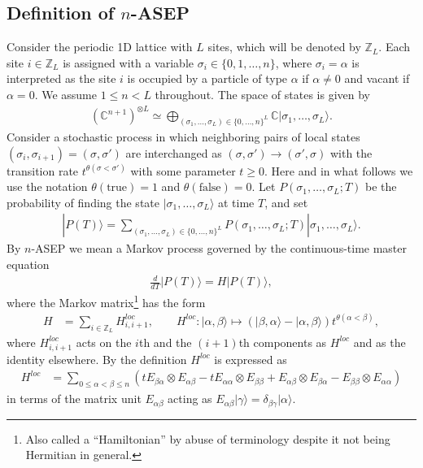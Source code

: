 \documentclass[11pt]{article}
\theoremstyle{definition}
\numberwithin{equation}{section}
\newcommand{\Z}{{\mathbb Z}}
\newcommand{\ket}[1]{\lvert #1 \rangle}
\begin{document}
\subsection{Definition of \texorpdfstring{$n$}{n}-ASEP}
Consider the periodic 1D lattice with $L$ sites, which will be denoted by $\Z_L$.
Each site $i \in \Z_L$ is assigned with a variable
$\sigma_i \in \{0,1,\ldots, n\}$, where 
$\sigma_i = \alpha$ is interpreted as the site $i$ is occupied by a particle of type $\alpha$
if $\alpha \neq 0$ and vacant if $\alpha=0$.
We assume $1 \le n <  L$ throughout.
The space of states is given by
\begin{align}\label{W}
(\mathbb{C}^{n+1})^{\otimes L} \simeq 
\bigoplus_{(\sigma_1,\ldots, \sigma_L) \in\{0,\ldots, n\}^L} 
\mathbb{C}|\sigma_1,\ldots, \sigma_L\rangle.
\end{align}
Consider a stochastic process
in which neighboring pairs of local states
$(\sigma_i, \sigma_{i+1}) = (\sigma, \sigma')$ 
are interchanged as $(\sigma,\sigma') \rightarrow (\sigma', \sigma)$
with the transition rate $t^{\theta(\sigma<\sigma')}$ with some parameter $t\ge 0$.
Here and in what follows we use the notation $\theta(\text{true}) = 1$ and $\theta(\text{false}) = 0$.
%
Let $P(\sigma_1,\ldots, \sigma_L; T)$ be the probability of finding 
the state $\ket{\sigma_1,\ldots, \sigma_L}$ at time $T$, and set
\begin{align}
|P(T)\rangle
= \sum_{(\sigma_1,\ldots, \sigma_L) \in\{0,\ldots, n\}^L}
P(\sigma_1,\ldots, \sigma_L; T)|\sigma_1,\ldots, \sigma_L\rangle.
\end{align}
By $n$-ASEP we mean a Markov process
governed by the continuous-time master equation
\begin{align}
\frac{d}{dT}|P(T)\rangle
= H |P(T)\rangle,
\end{align}
where the Markov matrix\footnote{Also called a ``Hamiltonian'' by abuse of terminology despite it not being Hermitian in general.}
has the form
\begin{align}
H &= \sum_{i \in \Z_L}H^{loc}_{i,i+1},
\qquad 
H^{loc} \colon \ket{\alpha, \beta} \mapsto 
(\ket{\beta,\alpha} - \ket{\alpha, \beta}) t^{\theta(\alpha< \beta)},
\end{align}
where $H^{loc}_{i,i+1}$ acts on the $i$th and the $(i\!+\!1)$th components
as $H^{loc}$ and as the identity elsewhere.
By the definition $H^{loc}$ is expressed as
\begin{align}\label{hloc}
H^{loc} &= \sum_{0\le \alpha < \beta \le n}
(t E_{\beta \alpha}\otimes E_{\alpha \beta} -t E_{\alpha \alpha}\otimes E_{\beta \beta}
+ E_{\alpha \beta} \otimes E_{\beta \alpha} - E_{\beta \beta}\otimes E_{\alpha \alpha})
\end{align}
in terms of the matrix unit $E_{\alpha \beta}$ acting as
$E_{\alpha \beta} \ket{\gamma} = \delta_{\beta \gamma} \ket{\alpha}$.
\end{document}

